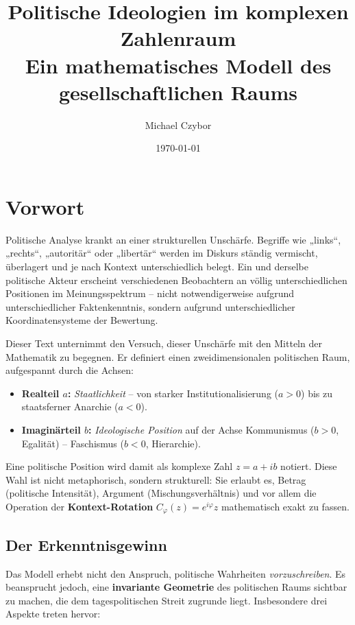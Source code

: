 \documentclass[12pt, a4paper]{article}
\begin{document}
\title{Politische Ideologien im komplexen Zahlenraum\\
\large{Ein mathematisches Modell des gesellschaftlichen Raums}}
\author{Michael Czybor}
\date{\today}
\maketitle

\section*{Vorwort}

Politische Analyse krankt an einer strukturellen Unschärfe. Begriffe wie „links“, „rechts“, „autoritär“ oder „libertär“ werden im Diskurs ständig vermischt, überlagert und je nach Kontext unterschiedlich belegt. Ein und derselbe politische Akteur erscheint verschiedenen Beobachtern an völlig unterschiedlichen Positionen im Meinungsspektrum – nicht notwendigerweise aufgrund unterschiedlicher Faktenkenntnis, sondern aufgrund unterschiedlicher Koordinatensysteme der Bewertung.

Dieser Text unternimmt den Versuch, dieser Unschärfe mit den Mitteln der Mathematik zu begegnen. Er definiert einen zweidimensionalen politischen Raum, aufgespannt durch die Achsen:

\begin{itemize}
    \item \textbf{Realteil \(a\):} \emph{Staatlichkeit} – von starker Institutionalisierung (\(a > 0\)) bis zu staatsferner Anarchie (\(a < 0\)).
    \item \textbf{Imaginärteil \(b\):} \emph{Ideologische Position} auf der Achse Kommunismus (\(b > 0\), Egalität) – Faschismus (\(b < 0\), Hierarchie).
\end{itemize}

Eine politische Position wird damit als komplexe Zahl \(z = a + ib\) notiert. Diese Wahl ist nicht metaphorisch, sondern strukturell: Sie erlaubt es, Betrag (politische Intensität), Argument (Mischungsverhältnis) und vor allem die Operation der \textbf{Kontext-Rotation} \(C_\varphi(z) = e^{i\varphi} z\) mathematisch exakt zu fassen.

\subsection*{Der Erkenntnisgewinn}

Das Modell erhebt nicht den Anspruch, politische Wahrheiten \emph{vorzuschreiben}. Es beansprucht jedoch, eine \textbf{invariante Geometrie} des politischen Raums sichtbar zu machen, die dem tagespolitischen Streit zugrunde liegt. Insbesondere drei Aspekte treten hervor:
\end{document}
